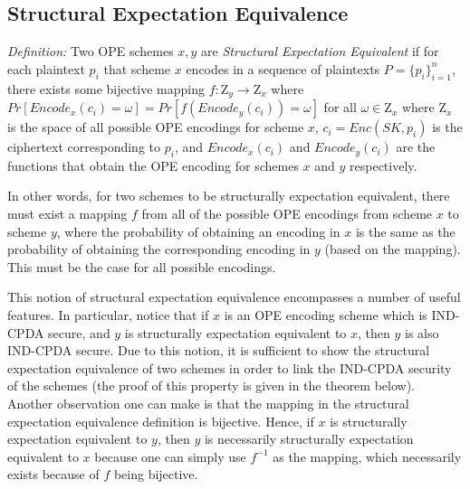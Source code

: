 \documentclass[12pt]{article}
\begin{document}
  \subsection{Structural Expectation Equivalence}

  \emph{Definition:} Two OPE schemes $x,y$ are \emph{Structural Expectation Equivalent} if for each plaintext $p_i$ that scheme $x$ encodes in a sequence of plaintexts $P = \{p_i\}_{i=1}^n$, there exists some bijective mapping $f: \mathrm{Z}_y \to \mathrm{Z}_x$ where $Pr[Encode_x(c_i) = \omega] = Pr[f(Encode_y(c_i)) = \omega]$ for all $\omega \in \mathrm{Z}_x$ where $\mathrm{Z}_x$ is the space of all possible OPE encodings for scheme $x$, $c_i = Enc(SK, p_i)$ is the ciphertext corresponding to $p_i$, and $Encode_x(c_i)$ and $Encode_y(c_i)$ are the functions that obtain the OPE encoding for schemes $x$ and $y$ respectively.

  In other words, for two schemes to be structurally expectation equivalent, there must exist a mapping $f$ from all of the possible OPE encodings from scheme $x$ to scheme $y$, where the probability of obtaining an encoding in $x$ is the same as the probability of obtaining the corresponding encoding in $y$ (based on the mapping). This must be the case for all possible encodings.

  This notion of structural expectation equivalence encompasses a number of useful features. In particular, notice that if $x$ is an OPE encoding scheme which is IND-CPDA secure, and $y$ is structurally expectation equivalent to $x$, then $y$ is also IND-CPDA secure. Due to this notion, it is sufficient to show the structural expectation equivalence of two schemes in order to link the IND-CPDA security of the schemes (the proof of this property is given in the theorem below). Another observation one can make is that the mapping in the structural expectation equivalence definition is bijective. Hence, if $x$ is structurally expectation equivalent to $y$, then $y$ is necessarily structurally expectation equivalent to $x$ because one can simply use $f^{-1}$ as the mapping, which necessarily exists because of $f$ being bijective.
\end{document}
